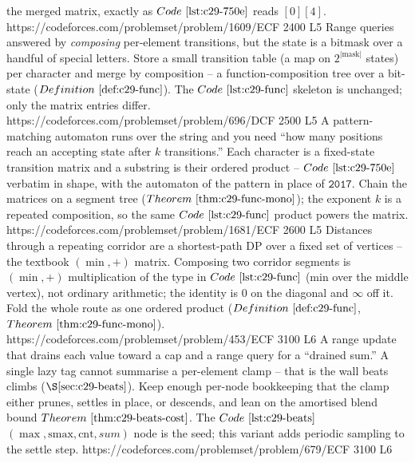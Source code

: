 \begin{mixedset}
{     the merged matrix, exactly as \(\coderef{c29-750e}\) reads \([0][4]\).}
    {https://codeforces.com/problemset/problem/1609/E}{CF 2400 L5}
    {Range queries answered by \emph{composing} per-element transitions, but the state is a bitmask
     over a handful of special letters. Store a small transition table (a map on \(2^{|\text{mask}|}\)
     states) per character and merge by composition -- a function-composition tree over a bit-state
     (\(\defref{c29-func}\)). The \(\coderef{c29-func}\)  skeleton is unchanged; only
     the matrix entries differ.}
    {https://codeforces.com/problemset/problem/696/D}{CF 2500 L5}
    {A pattern-matching automaton runs over the string and you need ``how many positions reach an
     accepting state after \(k\) transitions.'' Each character is a fixed-state transition matrix and
     a substring is their ordered product -- \(\coderef{c29-750e}\) verbatim in shape, with the
     automaton of the pattern in place of \(\mathtt{2017}\). Chain the matrices on a segment tree
     (\(\thmref{c29-func-mono}\)); the exponent \(k\) is a repeated composition, so the same
     \(\coderef{c29-func}\) product powers the matrix.}
    {https://codeforces.com/problemset/problem/1681/E}{CF 2600 L5}
    {Distances through a repeating corridor are a shortest-path DP over a fixed set of vertices -- the
     textbook \((\min,+)\) matrix. Composing two corridor segments is \((\min,+)\) multiplication of
     the type in \(\coderef{c29-func}\) (min over the middle vertex), not ordinary arithmetic; the
     identity is \(0\) on the diagonal and \(\infty\) off it. Fold the whole route as one ordered
     product (\(\defref{c29-func}\), \(\thmref{c29-func-mono}\)).}
    {https://codeforces.com/problemset/problem/453/E}{CF 3100 L6}
    {A range update that drains each value toward a cap and a range query for a ``drained sum.'' A
     single lazy tag cannot summarise a per-element clamp -- that is the wall beats climbs
     (\(\secref{c29-beats}\)). Keep enough per-node bookkeeping that the clamp either prunes, settles
     in place, or descends, and lean on the amortised blend bound \(\thmref{c29-beats-cost}\). The
     \(\coderef{c29-beats}\) \((\max,\mathrm{smax},\mathrm{cnt},\mathit{sum})\) node is the seed; this
     variant adds periodic sampling to the settle step.}
    {https://codeforces.com/problemset/problem/679/E}{CF 3100 L6}

\end{mixedset}
